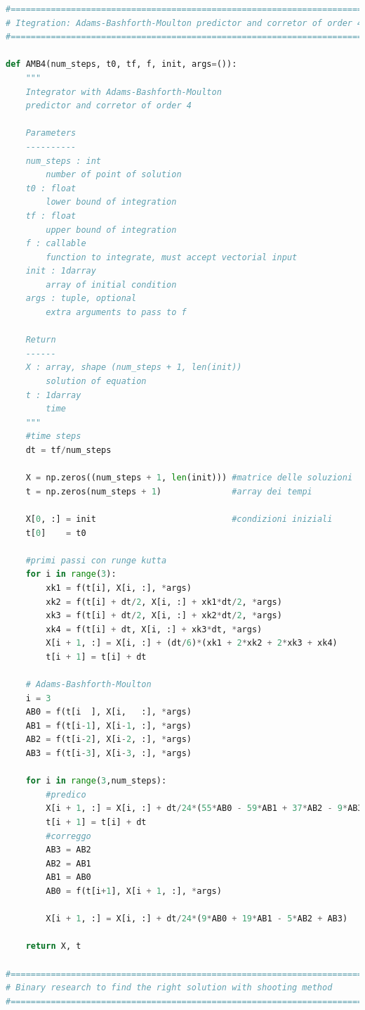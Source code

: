 \documentclass[10pt,a4paper]{article}
\begin{document}
\begin{lstlisting}[language=Python]
#============================================================================
# Itegration: Adams-Bashforth-Moulton predictor and corretor of order 4
#============================================================================

def AMB4(num_steps, t0, tf, f, init, args=()):
    """
    Integrator with Adams-Bashforth-Moulton
    predictor and corretor of order 4

    Parameters
    ----------
    num_steps : int
        number of point of solution
    t0 : float
        lower bound of integration
    tf : float
        upper bound of integration
    f : callable
        function to integrate, must accept vectorial input
    init : 1darray
        array of initial condition
    args : tuple, optional
        extra arguments to pass to f

    Return
    ------
    X : array, shape (num_steps + 1, len(init))
        solution of equation
    t : 1darray
        time
    """
    #time steps
    dt = tf/num_steps

    X = np.zeros((num_steps + 1, len(init))) #matrice delle soluzioni
    t = np.zeros(num_steps + 1)              #array dei tempi

    X[0, :] = init                           #condizioni iniziali
    t[0]    = t0

    #primi passi con runge kutta
    for i in range(3):
        xk1 = f(t[i], X[i, :], *args)
        xk2 = f(t[i] + dt/2, X[i, :] + xk1*dt/2, *args)
        xk3 = f(t[i] + dt/2, X[i, :] + xk2*dt/2, *args)
        xk4 = f(t[i] + dt, X[i, :] + xk3*dt, *args)
        X[i + 1, :] = X[i, :] + (dt/6)*(xk1 + 2*xk2 + 2*xk3 + xk4)
        t[i + 1] = t[i] + dt

    # Adams-Bashforth-Moulton
    i = 3
    AB0 = f(t[i  ], X[i,   :], *args)
    AB1 = f(t[i-1], X[i-1, :], *args)
    AB2 = f(t[i-2], X[i-2, :], *args)
    AB3 = f(t[i-3], X[i-3, :], *args)

    for i in range(3,num_steps):
        #predico
        X[i + 1, :] = X[i, :] + dt/24*(55*AB0 - 59*AB1 + 37*AB2 - 9*AB3)
        t[i + 1] = t[i] + dt
        #correggo
        AB3 = AB2
        AB2 = AB1
        AB1 = AB0
        AB0 = f(t[i+1], X[i + 1, :], *args)

        X[i + 1, :] = X[i, :] + dt/24*(9*AB0 + 19*AB1 - 5*AB2 + AB3)

    return X, t

#============================================================================
# Binary research to find the right solution with shooting method
#============================================================================


\end{lstlisting}
\end{document}
